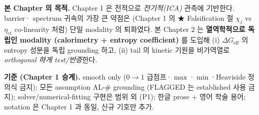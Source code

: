 \documentclass[11pt,a4paper]{article}
\newcommand{\eff}{\mathrm{eff}}
\begin{document}
\textbf{본 Chapter 의 목적.} Chapter 1 은 전적으로 \emph{전기적(ICA)} 관측에 기반한다. barrier·
spectrum 귀속의 가장 큰 약점은 (Chapter 1 의 ★ Falsification 절 $\chi_j$ vs $\eta_{\mathrm{ct}}$
co-linearity 처럼) 단일 modality 의 퇴화였다. 본 Chapter 2 는 \textbf{열역학적으로 독립인 modality
(calorimetry + entropy coefficient)} 를 도입해 (i) $\Delta G_\eff$ 의 entropy 성분을 독립
grounding 하고, (ii) tail 의 kinetic 기원을 비가역열로 \emph{orthogonal 하게 test/반증}한다.

\textbf{기준 (Chapter 1 승계).} smooth only ($0\!\to\!1$ 급점프·$\max$·$\min$·Heaviside 정의식
금지); 모든 assumption AL-\# grounding (FLAGGED 는 established 사용 금지); solver/numerical-fitting
구현은 범위 외 (P1); 한글 prose + 영어 학술 용어; notation 은 Chapter 1 과 동일, 신규 기호만 추가.

\end{document}
